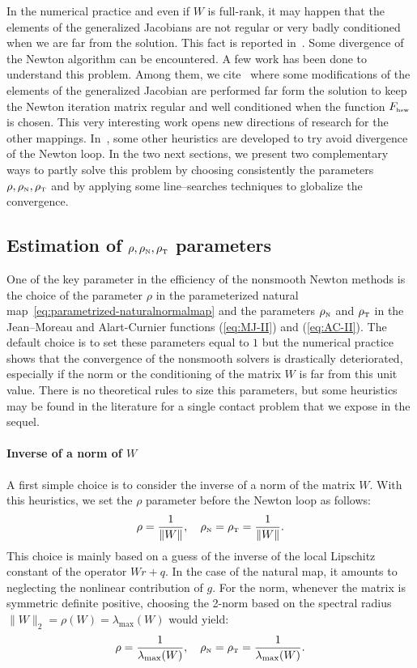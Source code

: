 In the numerical practice and even if $W$ is full-rank, it may happen that the elements of the generalized Jacobians are not regular or very badly conditioned when we are far from the solution. This fact is reported in~\cite{Alart1993,Alart95,Jourdan.Alart.ea98,Hueber.ea_SJSC2008,Koziara.Bicanic_CMAME2008}. Some divergence of the Newton algorithm can be encountered. A few work has been done to understand this problem. Among them, we cite~\cite{Hueber.ea_SJSC2008} where some modifications of the elements of the generalized Jacobian are performed far form the solution to keep the Newton iteration matrix regular and well conditioned when the function $F_{\hbox{\tiny{hsw}}}$ is chosen. This very interesting work opens new directions of research for the other mappings. In~\cite{Koziara.Bicanic_CMAME2008}, some other heuristics are developed to try avoid divergence of the Newton loop. In the two next sections, we present two complementary ways to partly solve this problem by choosing consistently the parameters $\rho, \rho_{\hbox{\tiny{N}}}, \rho_{\hbox{\tiny{T}}}$ and by applying some line--searches techniques to globalize the convergence.


\subsection{Estimation of $\rho, \rho_{\hbox{\tiny{N}}}, \rho_{\hbox{\tiny{T}}}$ parameters}

One of the key parameter in the efficiency of the nonsmooth Newton methods is the choice of the parameter $\rho$ in the parameterized natural map~\eqref{eq:parametrized-naturalnormalmap} and the parameters  $\rho_{\hbox{\tiny{N}}}$ and $\rho_{\hbox{\tiny{T}}}$ in the Jean--Moreau and Alart-Curnier functions (\ref{eq:MJ-II}) and (\ref{eq:AC-II}). The default choice is to set these parameters equal to $1$ but the numerical practice shows  that the convergence of the nonsmooth solvers is drastically deteriorated, especially  if the norm or the conditioning of the matrix $W$ is far from this unit value. There is no theoretical rules to size this parameters, but some heuristics may be found in the literature for a single contact problem that we expose in the sequel.

\paragraph{Inverse of a norm of $W$} A first simple choice is to consider the inverse of a norm of the matrix $W$. With this heuristics, we set the $\rho$ parameter before the Newton loop as follows:
\begin{equation}
  \label{eq:rho-1}
  \rho = \frac 1 {\|W\|}, \quad  \rho_\n =  \rho_\t = \frac 1 {\|W\|}.
\end{equation}
This choice is mainly based on a guess of the inverse of the local Lipschitz constant of the operator $Wr+q$. In the case of the natural map, it amounts to neglecting the nonlinear contribution of $g$.
For the norm, whenever the matrix is symmetric definite positive, choosing the 2-norm based on the spectral radius $\|W\|_2= \rho(W) =\lambda_{\max}(W)$ would yield:
\begin{equation}
  \label{eq:rho-2}
  \rho = \frac 1 {\lambda_{\max}(W)}, \quad  \rho_\n = \rho_\t = \frac 1 {\lambda_{\max}(W)}.
\end{equation}


